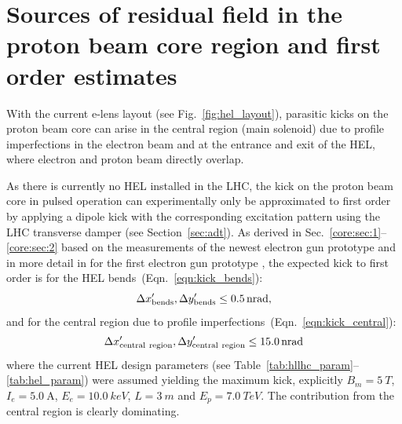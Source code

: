 \documentclass[%
 reprint,
 amsmath,amssymb,
 aps,
prstab,
]{revtex4-1}
\newcommand{\q}[2]{\ensuremath{#1\ \mathrm{#2}}} %
\begin{document}
\section{\label{sec:core}Sources of residual field in the proton beam core region and first order estimates}
With the current e-lens layout (see Fig.~\ref{fig:hel_layout}), parasitic kicks on the proton beam core can arise in the central region (main solenoid) due to profile imperfections in the electron beam and at the entrance and exit of the HEL, where electron and proton beam directly overlap.

As there is currently no HEL installed in the LHC, the kick on the proton beam core in pulsed operation can experimentally only be approximated to first order by applying a dipole kick with the corresponding excitation pattern using the LHC transverse damper (see Section~\ref{sec:adt}). As derived in Sec.~\ref{core:sec:1}--\ref{core:sec:2} based on the measurements of the newest electron gun prototype \cite{} and in more detail in \cite{md_sim_hel_res_ex_fitterer} for the first electron gun prototype \cite{}, the expected kick to first order is for the HEL bends~(Eqn.~\ref{eqn:kick_bends}):
\begin{equation}
	\Delta x'_{\rm{bends}},\Delta y'_{\rm{bends}}\leq \SI{0.5}{nrad},
\end{equation}
and for the central region due to profile imperfections~(Eqn.~\ref{eqn:kick_central}):
\begin{equation}
	\Delta x'_{\rm{central \ region}}, \Delta y'_{\rm{central \ region}} \leq \SI{15.0}{nrad}
\end{equation}
where the current HEL design parameters (see Table~\ref{tab:hllhc_param}--\ref{tab:hel_param}) were assumed yielding the maximum kick, explicitly $B_{m}=\SI{5}{T}$, $I_e=\q{5.0}{A}$, $E_{e} = \SI{10.0}{keV}$, $L=\SI{3}{m}$ and $E_{p} = \SI{7.0}{TeV}$. The contribution from the central region is clearly dominating.
\end{document}
